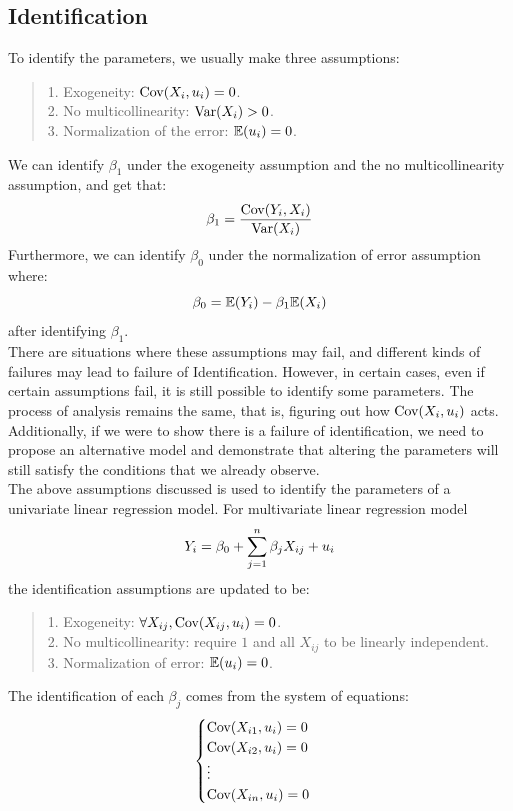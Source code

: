 \subsection{Identification}
To identify the parameters, we usually make three assumptions:
\begin{quote}
    1. Exogeneity: $\text{Cov}(X_i, u_i) = 0$. \\
    2. No multicollinearity: $\text{Var}(X_i) > 0$. \\
    3. Normalization of the error: $\mathbb{E}(u_i) = 0$.
\end{quote}
We can identify $\beta_1$ under the exogeneity assumption and the no multicollinearity assumption, and get that:
$$\beta_1 = \frac{\text{Cov}(Y_i, X_i)}{\text{Var}(X_i)}$$
Furthermore, we can identify $\beta_0$ under the normalization of error assumption where:
$$\beta_0 = \mathbb{E}(Y_i) - \beta_1\mathbb{E}(X_i)$$
after identifying $\beta_1$. \\
There are situations where these assumptions may fail, and different kinds of failures may lead to failure of Identification. However, in certain cases, even if certain assumptions fail, it is still possible to identify some parameters. The process of analysis remains the same, that is, figuring out how $\text{Cov}(X_i, u_i)$ acts. Additionally, if we were to show there is a failure of identification, we need to propose an alternative model and demonstrate that altering the parameters will still satisfy the conditions that we already observe. \\
The above assumptions discussed is used to identify the parameters of a univariate linear regression model. For multivariate linear regression model
$$Y_i = \beta_0 + \sum_{j = 1}^{n} \beta_j X_{ij} + u_i$$
the identification assumptions are updated to be:
\begin{quote}
    1. Exogeneity: $\forall X_{ij}, \text{Cov}(X_{ij}, u_i) = 0$. \\
    2. No multicollinearity: require $1$ and all $X_{ij}$ to be linearly independent. \\
    3. Normalization of error: $\mathbb{E}(u_i) = 0$.
\end{quote}
The identification of each $\beta_j$ comes from the system of equations:
$$\begin{cases}
    \text{Cov}(X_{i1}, u_i) = 0 \\
    \text{Cov}(X_{i2}, u_i) = 0 \\
    \vdots \\
    \text{Cov}(X_{in}, u_i) = 0 \\
\end{cases}$$
